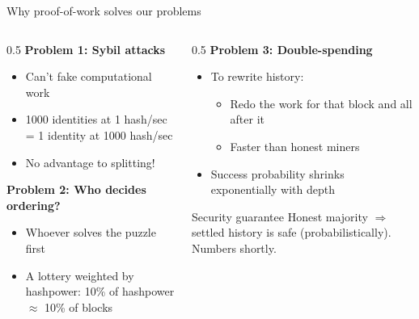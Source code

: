 \ifdefined\PRESENTATION\else\PassOptionsToClass{handout}{beamer}\fi\documentclass[aspectratio=169, lualatex]{beamer}
\begin{document}
\begin{frame}{Why proof-of-work solves our problems}
	\begin{columns}[c]
		\begin{column}{0.5\textwidth}
			\textbf{Problem 1: Sybil attacks}
			\begin{itemize}
				\item Can't fake computational work
				\item 1000 identities at 1 hash/sec = 1 identity at 1000 hash/sec
				\item No advantage to splitting!
			\end{itemize}
			\textbf{Problem 2: Who decides ordering?}
			\begin{itemize}
				\item Whoever solves the puzzle first
				\item A lottery weighted by hashpower: 10\% of hashpower $\approx$ 10\% of blocks
			\end{itemize}
		\end{column}
		\begin{column}{0.5\textwidth}
			\textbf{Problem 3: Double-spending}
			\begin{itemize}
				\item To rewrite history:
				      \begin{itemize}
					      \item Redo the work for that block and all after it
					      \item Faster than honest miners
				      \end{itemize}
				\item Success probability shrinks exponentially with depth
			\end{itemize}
			\begin{alertblock}{Security guarantee}
				Honest majority $\Rightarrow$ settled history is safe (probabilistically). Numbers shortly.
			\end{alertblock}
		\end{column}
	\end{columns}
\end{frame}
\end{document}

